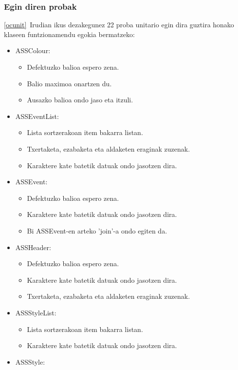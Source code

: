 \subsubsection{Egin diren probak}
\ref{ocunit}~Irudian ikus dezakegunez 22 proba unitario egin dira guztira honako klaseen funtzionamendu egokia bermatzeko:
\begin{itemize}
	\item ASSColour: \begin{itemize}
		\item Defektuzko balioa espero zena.
		\item Balio maximoa onartzen du.
		\item Ausazko balioa ondo jaso eta itzuli.
	\end{itemize}
	\item ASSEventList: \begin{itemize}
		\item Lista sortzerakoan item bakarra listan.
		\item Txertaketa, ezabaketa eta aldaketen eraginak zuzenak.
		\item Karaktere kate batetik datuak ondo jasotzen dira.
	\end{itemize}
	\item ASSEvent: \begin{itemize}
		\item Defektuzko balioa espero zena.
		\item Karaktere kate batetik datuak ondo jasotzen dira.
		\item Bi ASSEvent-en arteko 'join'-a ondo egiten da.
	\end{itemize}
	\item ASSHeader: \begin{itemize}
		\item Defektuzko balioa espero zena.
		\item Karaktere kate batetik datuak ondo jasotzen dira.
		\item Txertaketa, ezabaketa eta aldaketen eraginak zuzenak.
	\end{itemize}
	\item ASSStyleList: \begin{itemize}
		\item Lista sortzerakoan item bakarra listan.
		\item Karaktere kate batetik datuak ondo jasotzen dira.
	\end{itemize}
	\item ASSStyle: \begin{itemize}

\end{itemize}
\end{itemize}
